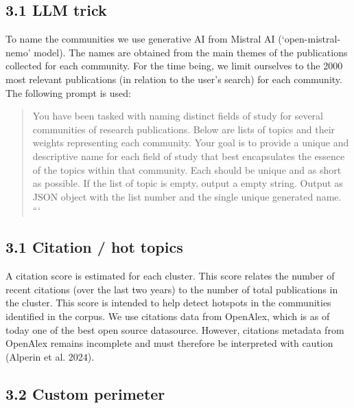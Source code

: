 \documentclass[
]{article}
\begin{document}
\hypertarget{llm-trick}{%
\subsection{3.1 LLM trick}\label{llm-trick}}

To name the communities we use generative AI from Mistral AI
(`open-mistral-nemo' model). The names are obtained from the main themes
of the publications collected for each community. For the time being, we
limit ourselves to the 2000 most relevant publications (in relation to
the user's search) for each community. The following prompt is used:

\begin{quote}
You have been tasked with naming distinct fields of study for several
communities of research publications. Below are lists of topics and
their weights representing each community. Your goal is to provide a
unique and descriptive name for each field of study that best
encapsulates the essence of the topics within that community. Each
should be unique and as short as possible. If the list of topic is
empty, output a empty string. Output as JSON object with the list number
and the single unique generated name. ```
\end{quote}

\hypertarget{citation-hot-topics}{%
\subsection{3.1 Citation / hot topics}\label{citation-hot-topics}}

A citation score is estimated for each cluster. This score relates the
number of recent citations (over the last two years) to the number of
total publications in the cluster. This score is intended to help detect
hotspots in the communities identified in the corpus. We use citations
data from OpenAlex, which is as of today one of the best open source
datasource. However, citations metadata from OpenAlex remains incomplete
and must therefore be interpreted with caution (Alperin et al. 2024).

\hypertarget{custom-perimeter}{%
\subsection{3.2 Custom perimeter}\label{custom-perimeter}}
\end{document}
